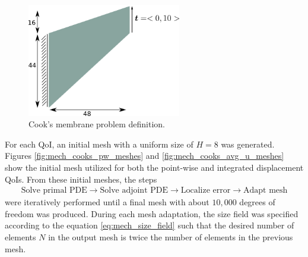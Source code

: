 \begin{figure}[ht!]
\centering
\includegraphics[width=0.6\textwidth]{img/mech_cooks_geom.png}
\caption{Cook's membrane problem definition.}
\label{fig:cooks_geom}
\end{figure}

For each QoI, an initial mesh with a uniform size of $H=8$
was generated. Figures \ref{fig:mech_cooks_pw_meshes} and
\ref{fig:mech_cooks_avg_u_meshes} show the initial mesh utilized for both
the point-wise and integrated displacement QoIs. From these initial meshes,
the steps
%
\begin{gather*}
\text{Solve primal PDE} \rightarrow
\text{Solve adjoint PDE} \rightarrow
\text{Localize error} \rightarrow
\text{Adapt mesh}
\end{gather*}
%
were iteratively performed until a final mesh with about $10,000$ degrees
of freedom was produced. During each mesh adaptation, the size field was
specified according to the equation \eqref{eq:mech_size_field} such that
the desired number of elements $N$ in the output mesh is twice the number
of elements in the previous mesh.

